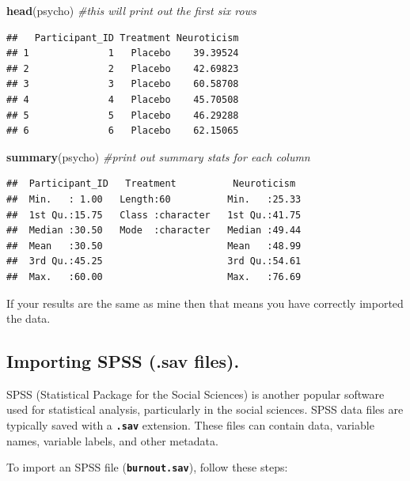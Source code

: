 \documentclass[
]{book}
\newenvironment{Shaded}{\begin{snugshade}}{\end{snugshade}}
\newcommand{\CommentTok}[1]{\textcolor[rgb]{0.56,0.35,0.01}{\textit{#1}}}
\newcommand{\FunctionTok}[1]{\textcolor[rgb]{0.13,0.29,0.53}{\textbf{#1}}}
\newcommand{\NormalTok}[1]{#1}
\begin{document}
\begin{Shaded}
\begin{Highlighting}[]
\FunctionTok{head}\NormalTok{(psycho) }\CommentTok{\#this will print out the first six rows}
\end{Highlighting}
\end{Shaded}

\begin{verbatim}
##   Participant_ID Treatment Neuroticism
## 1              1   Placebo    39.39524
## 2              2   Placebo    42.69823
## 3              3   Placebo    60.58708
## 4              4   Placebo    45.70508
## 5              5   Placebo    46.29288
## 6              6   Placebo    62.15065
\end{verbatim}

\begin{Shaded}
\begin{Highlighting}[]
\FunctionTok{summary}\NormalTok{(psycho) }\CommentTok{\#print out summary stats for each column}
\end{Highlighting}
\end{Shaded}

\begin{verbatim}
##  Participant_ID   Treatment          Neuroticism   
##  Min.   : 1.00   Length:60          Min.   :25.33  
##  1st Qu.:15.75   Class :character   1st Qu.:41.75  
##  Median :30.50   Mode  :character   Median :49.44  
##  Mean   :30.50                      Mean   :48.99  
##  3rd Qu.:45.25                      3rd Qu.:54.61  
##  Max.   :60.00                      Max.   :76.69
\end{verbatim}

If your results are the same as mine then that means you have correctly imported the data.

\hypertarget{importing-spss-.sav-files.}{%
\subsection{Importing SPSS (.sav files).}\label{importing-spss-.sav-files.}}

SPSS (Statistical Package for the Social Sciences) is another popular software used for statistical analysis, particularly in the social sciences. SPSS data files are typically saved with a \textbf{\texttt{.sav}} extension. These files can contain data, variable names, variable labels, and other metadata.

To import an SPSS file (\textbf{\texttt{burnout.sav}}), follow these steps:
\end{document}
